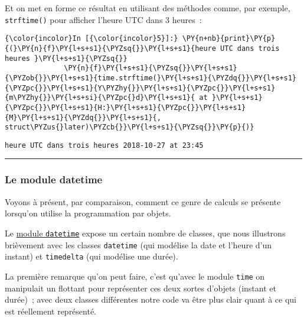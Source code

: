     Et on met en forme ce résultat en utilisant des méthodes comme, par
exemple, \texttt{strftime()} pour afficher l'heure UTC dans 3 heures~:

    \begin{Verbatim}[commandchars=\\\{\},frame=single,framerule=0.3mm,rulecolor=\color{cellframecolor}]
{\color{incolor}In [{\color{incolor}5}]:} \PY{n+nb}{print}\PY{p}{(}\PY{n}{f}\PY{l+s+s1}{\PYZsq{}}\PY{l+s+s1}{heure UTC dans trois heures }\PY{l+s+s1}{\PYZsq{}}
              \PY{n}{f}\PY{l+s+s1}{\PYZsq{}}\PY{l+s+s1}{\PYZob{}}\PY{l+s+s1}{time.strftime(}\PY{l+s+s1}{\PYZdq{}}\PY{l+s+s1}{\PYZpc{}}\PY{l+s+s1}{Y\PYZhy{}}\PY{l+s+s1}{\PYZpc{}}\PY{l+s+s1}{m\PYZhy{}}\PY{l+s+si}{\PYZpc{}d}\PY{l+s+s1}{ at }\PY{l+s+s1}{\PYZpc{}}\PY{l+s+s1}{H:}\PY{l+s+s1}{\PYZpc{}}\PY{l+s+s1}{M}\PY{l+s+s1}{\PYZdq{}}\PY{l+s+s1}{, struct\PYZus{}later)\PYZcb{}}\PY{l+s+s1}{\PYZsq{}}\PY{p}{)}
\end{Verbatim}


    \begin{Verbatim}[commandchars=\\\{\},frame=single,framerule=0.3mm,rulecolor=\color{cellframecolor}]
heure UTC dans trois heures 2018-10-27 at 23:45
\end{Verbatim}

    \begin{center}\rule{0.5\linewidth}{\linethickness}\end{center}

    \hypertarget{le-module-datetime}{%
\subsubsection{Le module datetime}\label{le-module-datetime}}

    Voyons à présent, par comparaison, comment ce genre de calculs se
présente lorsqu'on utilise la programmation par objets.

Le \href{https://docs.python.org/3/library/datetime.html}{module
\texttt{datetime}} expose un certain nombre de classes, que nous
illustrons brièvement avec les classes \texttt{datetime} (qui modélise
la date et l'heure d'un instant) et \texttt{timedelta} (qui modélise une
durée).

La première remarque qu'on peut faire, c'est qu'avec le module
\texttt{time} on manipulait un flottant pour représenter ces deux sortes
d'objets (instant et durée)~; avec deux classes différentes notre code
va être plus clair quant à ce qui est réellement représenté.

